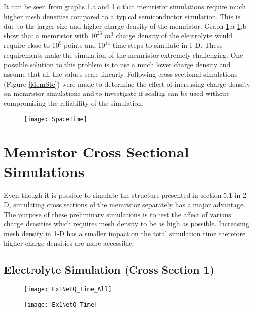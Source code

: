 It can be seen from graphs \ref{SpaceTime}.a and \ref{SpaceTime}.c that memristor simulations require much higher mesh densities compared to a typical semiconductor simulation. This is due to the larger size and higher charge density of the memristor. Graph \ref{SpaceTime}.a \ref{SpaceTime}.b show that a memristor with $10^{26}$ $m^{3}$ charge density of the electrolyte would require close to $10^9$ points and $10^{14}$ time steps to simulate in 1-D. These requirements make the simulation of the memristor extremely challenging. One possible solution to this problem is to use a much lower charge density and assume that all the values scale linearly. Following cross sectional simulations (Figure \ref{MemStc}) were made to determine the effect of increasing charge density on memristor simulations and to investigate if scaling can be used without compromising the reliability of the simulation.

\begin{landscape}
\begin{figure}[htp]
\centering
\texttt{[image: SpaceTime]}
\caption{} 
\label{SpaceTime}
\end{figure}
\end{landscape}

\clearpage
\section{Memristor Cross Sectional Simulations}

Even though it is possible to simulate the structure presented in section 5.1 in 2-D, simulating cross sections of the memristor separately has a major advantage. The purpose of these preliminary  simulations is to test the affect of various charge densities which requires mesh density to be as high as possible. Increasing mesh density in 1-D has a smaller impact on the total simulation time therefore higher charge densities are more accessible.  

\subsection{Electrolyte Simulation (Cross Section 1)}


\begin{figure}[!htp]
\centering
\texttt{[image: Ex1NetQ\_Time\_All]}
\caption{} 
\label{}
\end{figure}



\begin{landscape}
\begin{figure}[!htp]
\centering
\texttt{[image: Ex1NetQ\_Time]}
\caption{} 
\label{}
\end{figure}
\end{landscape}

